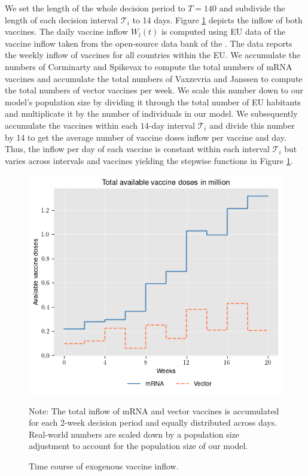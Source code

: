 We set the length of the whole decision period to $T=140$ and subdivide the length of each decision interval $\mathcal{T}_i$ to 14 days. 
Figure \ref{fig:available_vaccine} depicts the inflow of both vaccines. The daily vaccine inflow $W_l(t)$ is computed using EU data of the vaccine inflow taken from the open-source data bank of the \cite{ECDC.2021}. The data reports the weekly inflow of vaccines for all countries within the EU. We accumulate the numbers of Corminarty and Spikevax to compute the total numbers of mRNA vaccines and accumulate the total numbers of Vaxzevria and Janssen to compute the total numbers of vector vaccines per week. We scale this number down to our model's population size by dividing it through the total number of EU habitants and multiplicate it by the number of individuals in our model. We subsequently accumulate the vaccines within each $14$-day interval $\mathcal{T}_i$ and divide this number by 14 to get the average number of vaccine doses inflow per vaccine and day. Thus, the inflow per day of each vaccine is constant within each interval $\mathcal{T}_i$ but varies across intervals and vaccines yielding the stepwise functions in Figure \ref{fig:available_vaccine}. 
\begin{figure}[h!]
\centering
\includegraphics[scale=0.6]{images/available_vaccine.png}
\begin{flushleft}
\scriptsize{Note:} The total inflow of mRNA and vector vaccines is accumulated for each 2-week decision period and equally distributed across days. Real-world numbers are scaled down by a population size adjustment to account for the population size of our model.  
\end{flushleft}
\caption{Time course of exogenous vaccine inflow.}
\label{fig:available_vaccine}
\end{figure}

